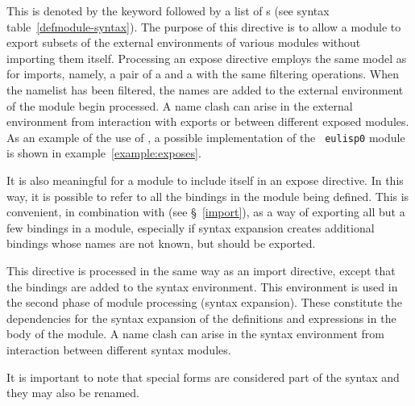 \begin{optDefinition}
This is denoted by the keyword  followed by a list of
s (see syntax table~\ref{defmodule-syntax}).  The
purpose of this directive is to allow a module to export subsets of the external
environments of various modules without importing them itself.  Processing an
expose directive employs the same model as for imports, namely, a pair of a
 and a  with the same filtering operations.  When the
namelist has been filtered, the names are added to the external environment of
the module begin processed.  A name clash can arise in the external environment
from interaction with exports or between different exposed modules.  As an
example of the use of , a possible implementation of the {\tt
    eulisp0}  module is shown in
example~\ref{example:exposes}.
%
\begin{example}
\label{example:exposes}
\end{example}
%
It is also meaningful for a module to include itself in an expose
directive.  In this way, it is possible to refer to all the bindings
in the module being defined.  This is convenient, in combination with
 (see \S~\ref{import}), as a way of exporting all but
a few bindings in a module, especially if syntax expansion creates
additional bindings whose names are not known, but should be exported.
\end{optDefinition}
%
\label{syntax-directive}
\begin{optDefinition}
This directive is processed in the same way as an import directive,
except that the bindings are added to the syntax environment.  This
environment is used in the second phase of module processing (syntax
expansion).  These constitute the dependencies for the syntax expansion
of the definitions and expressions in the body of the module.  A name
clash can arise in the syntax environment from interaction between
different syntax modules.

It is important to note that special forms are considered part of the
syntax and they may also be renamed.
\end{optDefinition}

